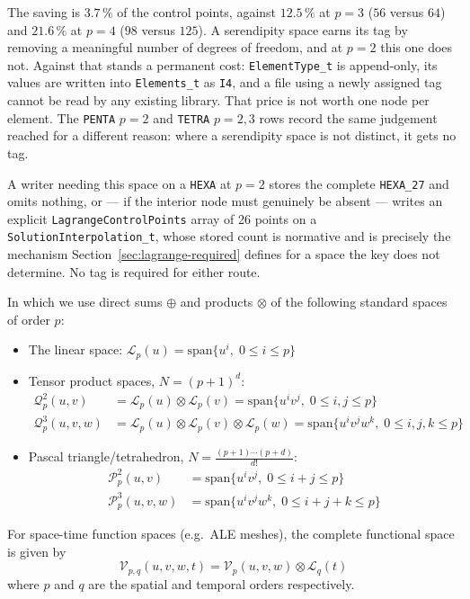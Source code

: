 \documentclass[11pt,letterpaper]{article}
\newenvironment{v2quote}
  {\begin{v2quoteframe}%
   \noindent{\footnotesize\sffamily\bfseries\color{cgnsblue}v2 text}%
   \nopagebreak\par\nopagebreak\vspace{0.15em}}
  {\end{v2quoteframe}}
\newif\ifvfourdraft
\newenvironment{v4block}{\ifvfourdraft\color{v4violet}\fi\ignorespaces}{\par}
\newcommand{\Lsp}{\mathcal{L}_p}
\newcommand{\Qtp}{\mathcal{Q}^{2}_p}
\newcommand{\Qthp}{\mathcal{Q}^{3}_p}
\newcommand{\Ptp}{\mathcal{P}^{2}_p}
\newcommand{\Pthp}{\mathcal{P}^{3}_p}
\newcommand{\Vpq}{\mathcal{V}_{p,q}}
\begin{document}
\begin{v4block}
The saving is $3.7\,\%$ of the control points, against $12.5\,\%$ at $p=3$
($56$ versus $64$) and $21.6\,\%$ at $p=4$ ($98$ versus $125$).  A serendipity
space earns its tag by removing a meaningful number of degrees of freedom, and at
$p=2$ this one does not.  Against that stands a permanent cost: \texttt{ElementType\_t}
is append-only, its values are written into \texttt{Elements\_t} as \texttt{I4},
and a file using a newly assigned tag cannot be read by any existing library.  That
price is not worth one node per element.  The \texttt{PENTA} $p=2$ and \texttt{TETRA}
$p=2,3$ rows record the same judgement reached for a different reason: where a
serendipity space is not distinct, it gets no tag.

A writer needing this space on a \texttt{HEXA} at $p=2$ stores the complete
\texttt{HEXA\_27} and omits nothing, or --- if the interior node must genuinely be
absent --- writes an explicit \texttt{LagrangeControlPoints} array of 26 points on a
\texttt{SolutionInterpolation\_t}, whose stored count is normative and is precisely
the mechanism Section~\ref{sec:lagrange-required} defines for a space the key does
not determine.  No tag is required for either route.
\end{v4block}

\begin{v2quote}
\noindent In which we use direct sums $\oplus$ and products $\otimes$ of the following standard spaces of order $p$:

\begin{itemize}
  \item The linear space: $\Lsp(u) = \mathrm{span}\{u^i,\; 0 \le i \le p\}$

  \item Tensor product spaces, $N = (p+1)^d$:
  \begin{align*}
    \Qtp(u,v)      &= \Lsp(u) \otimes \Lsp(v)      = \mathrm{span}\{u^i v^j,\; 0 \le i,j \le p\} \\
    \Qthp(u,v,w)   &= \Lsp(u) \otimes \Lsp(v) \otimes \Lsp(w)
                    = \mathrm{span}\{u^i v^j w^k,\; 0 \le i,j,k \le p\}
  \end{align*}

  \item Pascal triangle/tetrahedron, $N = \frac{(p+1)\cdots(p+d)}{d!}$:
  \begin{align*}
    \Ptp(u,v)      &= \mathrm{span}\{u^i v^j,\; 0 \le i+j \le p\} \\
    \Pthp(u,v,w)   &= \mathrm{span}\{u^i v^j w^k,\; 0 \le i+j+k \le p\}
  \end{align*}
\end{itemize}

For space-time function spaces (e.g.\ ALE meshes), the complete functional space is given by
%
\begin{equation}
  \Vpq(u,v,w,t) = \mathcal{V}_p(u,v,w) \otimes \mathcal{L}_q(t)
\end{equation}
%
where $p$ and $q$ are the spatial and temporal orders respectively.
\end{v2quote}
\end{document}
